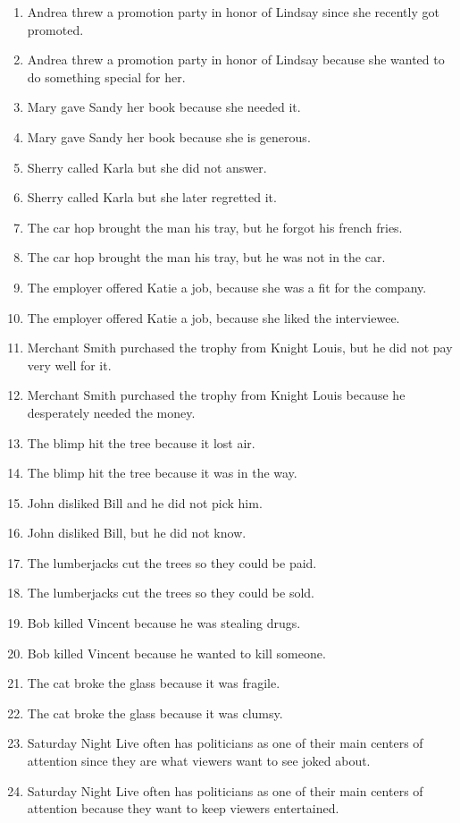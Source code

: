 \documentclass{article}
\begin{document}
\begin{enumerate}
\item Andrea threw a promotion party in honor of Lindsay since she recently got promoted.
\item Andrea threw a promotion party in honor of Lindsay because she wanted to do something special for her.
\item Mary gave Sandy her book because she needed it.
\item Mary gave Sandy her book because she is generous.
\item Sherry called Karla but she did not answer.
\item Sherry called Karla but she later regretted it.
\item The car hop brought the man his tray, but he forgot his french fries.
\item The car hop brought the man his tray, but he was not in the car.
\item The employer offered Katie a job, because she was a fit for the company.
\item The employer offered Katie a job, because she liked the interviewee.
\item Merchant Smith purchased the trophy from Knight Louis, but he did not pay very well for it.
\item Merchant Smith purchased the trophy from Knight Louis because he desperately needed the money.
\item The blimp hit the tree because it lost air.
\item The blimp hit the tree because it was in the way.
\item John disliked Bill and he did not pick him.
\item John disliked Bill, but he did not know.
\item The lumberjacks cut the trees so they could be paid.
\item The lumberjacks cut the trees so they could be sold.
\item Bob killed Vincent because he was stealing drugs.
\item Bob killed Vincent because he wanted to kill someone.
\item The cat broke the glass because it was fragile.
\item The cat broke the glass because it was clumsy.
\item Saturday Night Live often has politicians as one of their main centers of attention since they are what viewers want to see joked about.
\item Saturday Night Live often has politicians as one of their main centers of attention because they want to keep viewers entertained.

\end{enumerate}
\end{document}
